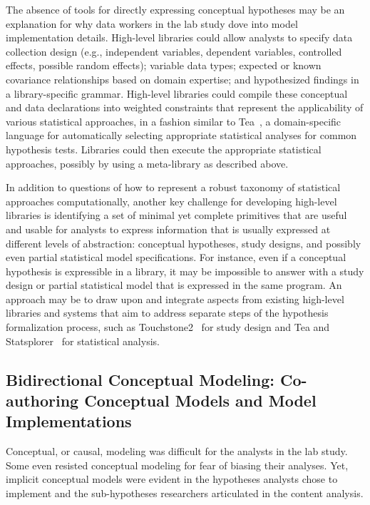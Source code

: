 The absence of tools for directly expressing conceptual hypotheses may be an
explanation for why data workers in the lab study dove into model
implementation details. High-level libraries could allow analysts to specify data
collection design (e.g., independent variables, dependent variables, controlled
effects, possible random effects); variable data types; expected or known
covariance relationships based on domain expertise; and hypothesized findings in
a library-specific grammar. High-level libraries could compile these conceptual
and data declarations into weighted constraints that represent the applicability
of various statistical approaches, in a fashion similar to
Tea~\cite{jun2019tea}, a domain-specific language for automatically selecting
appropriate statistical analyses for common hypothesis tests. Libraries could
then execute the appropriate statistical approaches, possibly by using a
meta-library as described above. 

In addition to questions of how to represent a robust taxonomy of statistical
approaches computationally, another key challenge for developing high-level
libraries is identifying a set of minimal yet complete primitives that are
useful and usable for analysts to express information that is usually expressed
at different levels of abstraction: conceptual hypotheses, study designs, and
possibly even partial statistical model specifications. For instance, even if a
conceptual hypothesis is expressible in a library, it may be impossible to
answer with a study design or partial statistical model that is expressed in the
same program. An approach may be to draw upon and integrate aspects from
existing high-level libraries and systems that aim to address separate steps of
the hypothesis formalization process, such as
Touchstone2~\cite{eiselmayer2019touchstone2} for study design and Tea and
Statsplorer~\cite{wacharamanotham2015statsplorer} for statistical analysis. 



\subsection{Bidirectional Conceptual Modeling: Co-authoring Conceptual Models and Model Implementations}
Conceptual, or causal, modeling was difficult for the analysts in the lab study.
Some even resisted conceptual modeling for fear of biasing their analyses. Yet,
implicit conceptual models were evident in the hypotheses analysts chose to
implement and the sub-hypotheses researchers articulated in the content
analysis. 

